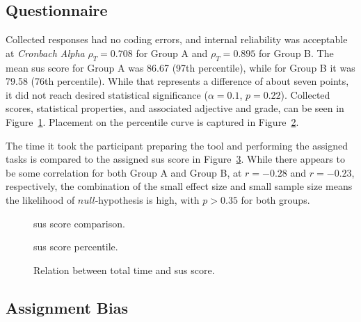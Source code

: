 \subsection{Questionnaire}

Collected responses had no coding errors, and internal reliability was acceptable at \emph{Cronbach Alpha} $\rho_T=0.708$ for Group A and $\rho_T=0.895$ for Group B.
The mean \gls{sus} score for Group A was 86.67 (97th percentile), while for Group B it was 79.58 (76th percentile).
While that represents a difference of about seven points, it did not reach desired statistical significance ($\alpha=0.1$, $p=0.22$).
Collected scores, statistical properties, and associated adjective and grade, can be seen in Figure~\ref{fig:plot-sus}.
Placement on the percentile curve is captured in Figure~\ref{fig:plot-sus-percentile}.

The time it took the participant preparing the tool and performing the assigned tasks is compared to the assigned \gls{sus} score in Figure~\ref{fig:plot-sus-time}.
While there appears to be some correlation for both Group A and Group B, at $r=-0.28$ and $r=-0.23$, respectively, the combination of the small effect size and small sample size means the likelihood of $null$-hypothesis is high, with $p > 0.35$ for both groups.

\begin{figure}[H]
    
    \caption{\gls{sus} score comparison.}
    \label{fig:plot-sus}
\end{figure}

\begin{figure}[H]
    
    \caption{\gls{sus} score percentile.}
    \label{fig:plot-sus-percentile}
\end{figure}

\begin{figure}[H]
    
    \caption{Relation between total time and \gls{sus} score.}
    \label{fig:plot-sus-time}
\end{figure}

\subsection{Assignment Bias}

